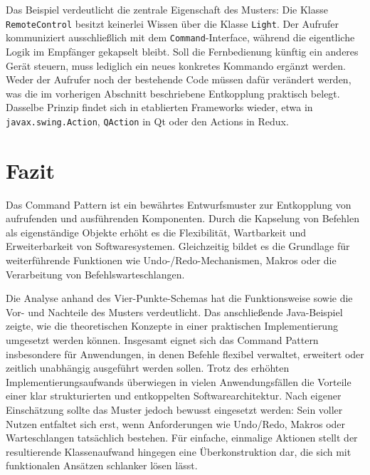 \documentclass[12pt,a4paper]{article}
\begin{document}
    Das Beispiel verdeutlicht die zentrale Eigenschaft des Musters: Die Klasse \texttt{RemoteControl}
    besitzt keinerlei Wissen über die Klasse \texttt{Light}. Der Aufrufer kommuniziert ausschließlich mit
    dem \texttt{Command}-Interface, während die eigentliche Logik im Empfänger gekapselt bleibt. Soll die
    Fernbedienung künftig ein anderes Gerät steuern, muss lediglich ein neues konkretes Kommando ergänzt
    werden. Weder der Aufrufer noch der bestehende Code müssen dafür verändert werden, was die im vorherigen
    Abschnitt beschriebene Entkopplung praktisch belegt. Dasselbe Prinzip findet sich in etablierten Frameworks
    wieder, etwa in \texttt{javax.swing.Action}, \texttt{QAction} in Qt oder den Actions in Redux.


    \section{Fazit}
    Das Command Pattern ist ein bewährtes Entwurfsmuster zur Entkopplung von aufrufenden und ausführenden Komponenten. Durch die Kapselung von Befehlen als eigenständige Objekte erhöht es die Flexibilität, Wartbarkeit und Erweiterbarkeit von Softwaresystemen. Gleichzeitig bildet es die Grundlage für weiterführende Funktionen wie Undo-/Redo-Mechanismen, Makros oder die Verarbeitung von Befehlswarteschlangen.

    Die Analyse anhand des Vier-Punkte-Schemas hat die Funktionsweise sowie die Vor- und Nachteile des Musters verdeutlicht. Das anschließende Java-Beispiel zeigte, wie die theoretischen Konzepte in einer praktischen Implementierung umgesetzt werden können. Insgesamt eignet sich das Command Pattern insbesondere für Anwendungen, in denen Befehle flexibel verwaltet, erweitert oder zeitlich unabhängig ausgeführt werden sollen. Trotz des erhöhten Implementierungsaufwands überwiegen in vielen Anwendungsfällen die Vorteile einer klar strukturierten und entkoppelten Softwarearchitektur. Nach eigener Einschätzung sollte das Muster jedoch bewusst eingesetzt werden: Sein voller Nutzen entfaltet sich erst, wenn Anforderungen wie Undo/Redo, Makros oder Warteschlangen tatsächlich bestehen. Für einfache, einmalige Aktionen stellt der resultierende Klassenaufwand hingegen eine Überkonstruktion dar, die sich mit funktionalen Ansätzen schlanker lösen lässt.


    \newpage

    \setcounter{page}{3} %

    \nocite{*}
    \printbibliography
\end{document}
